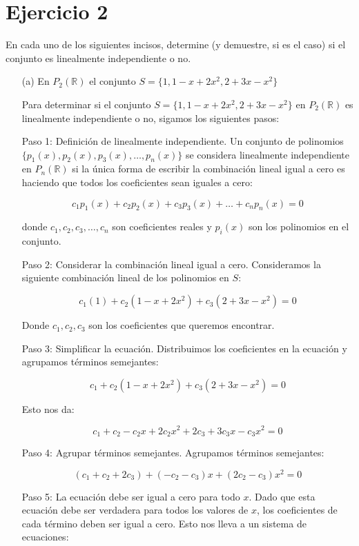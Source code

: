 \section*{Ejercicio 2}

En cada uno de los siguientes incisos, determine (y demuestre, si es el caso) si el conjunto es linealmente
independiente o no.

\begin{itemize}
    \item[(a)] En $P_{2}(\mathbb{R})$ el conjunto $S = \{ 1, 1 - x + 2x^{2}, 2 + 3x - x^{2} \}$  

    Para determinar si el conjunto \(S = \{1, 1 - x + 2x^{2}, 2 + 3x - x^{2}\}\) en \(P_{2}(\mathbb{R})\) es linealmente independiente o no, sigamos los siguientes pasos:

Paso 1: Definición de linealmente independiente.
Un conjunto de polinomios \(\{p_1(x), p_2(x), p_3(x), \ldots, p_n(x)\}\) se considera linealmente independiente en \(P_{n}(\mathbb{R})\) si la única forma de escribir la combinación lineal igual a cero es haciendo que todos los coeficientes sean iguales a cero:

\[
c_1p_1(x) + c_2p_2(x) + c_3p_3(x) + \ldots + c_np_n(x) = 0
\]

donde \(c_1, c_2, c_3, \ldots, c_n\) son coeficientes reales y \(p_i(x)\) son los polinomios en el conjunto.

Paso 2: Considerar la combinación lineal igual a cero.
Consideramos la siguiente combinación lineal de los polinomios en \(S\):

\[
c_1(1) + c_2(1 - x + 2x^{2}) + c_3(2 + 3x - x^{2}) = 0
\]

Donde \(c_1, c_2, c_3\) son los coeficientes que queremos encontrar.

Paso 3: Simplificar la ecuación.
Distribuimos los coeficientes en la ecuación y agrupamos términos semejantes:

\[
c_1 + c_2(1 - x + 2x^{2}) + c_3(2 + 3x - x^{2}) = 0
\]

Esto nos da:

\[
c_1 + c_2 - c_2x + 2c_2x^{2} + 2c_3 + 3c_3x - c_3x^{2} = 0
\]

Paso 4: Agrupar términos semejantes.
Agrupamos términos semejantes:

\[
(c_1 + c_2 + 2c_3) + (-c_2 - c_3)x + (2c_2 - c_3)x^{2} = 0
\]

Paso 5: La ecuación debe ser igual a cero para todo \(x\).
Dado que esta ecuación debe ser verdadera para todos los valores de \(x\), los coeficientes de cada término deben ser igual a cero. Esto nos lleva a un sistema de ecuaciones:


\end{itemize}
